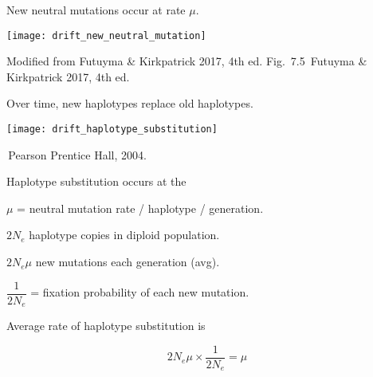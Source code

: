 \documentclass[t]{beamer}
\newcommand{\futuyma}[1]{%
	\ifthenelse{\isempty{#1}}%
	{Futuyma \& Kirkpatrick 2017, 4th ed.}%
	{Fig.~#1~Futuyma \& Kirkpatrick 2017, 4th ed.}%
}
\newcommand{\backskip}{\vspace{-0.5\baselineskip}}
\begin{document}


%
%
%
%
%
%
%
%
%
%


\begin{frame}{New neutral mutations occur at rate $\mu.$}

\backskip

\centering

\texttt{[image: drift\_new\_neutral\_mutation]}

\vfilll

\tinyfill Modified from \futuyma{7.5}

\end{frame}

\begin{frame}{Over time, new haplotypes replace old haplotypes.}

\vspace{-0.5\baselineskip}

\centering

\texttt{[image: drift\_haplotype\_substitution]}

\vfilll

\tinyfill \textcopyright\,Pearson Prentice Hall, 2004.
 
\end{frame}


\begin{frame}{Haplotype substitution occurs at the }

\backskip

\hangpara $\mu$ = neutral mutation rate / haplotype / generation.

\hangpara $2N_e$ haplotype copies in diploid population.

\hangpara $2N_e\mu$ new mutations each generation (avg).

\hangpara $\dfrac{1}{2N_e}$ = fixation probability of each new mutation.

\hangpara Average rate of haplotype substitution is

\begin{equation*}
2N_e\mu \times \dfrac{1}{2N_e} = \mu
\end{equation*}
\end{frame}
\end{document}

